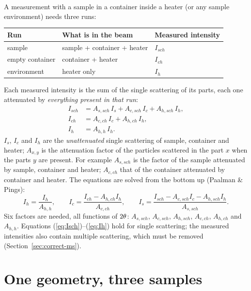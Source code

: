 A measurement with a sample in a container inside a heater (or any sample environment) needs three runs:
\begin{center}\small
\begin{tabular}{@{}lll@{}}
  \toprule \textbf{Run} & \textbf{What is in the beam} & \textbf{Measured intensity} \\ \midrule
  sample & sample + container + heater & $I_{sch}$ \\
  empty container & container + heater & $I_{ch}$ \\
  environment & heater only & $I_{h}$ \\ \bottomrule
\end{tabular}
\end{center}
Each measured intensity is the sum of the single scattering of its parts, each one attenuated by \emph{everything present in that run}:
\begin{align}
  I_{sch} &= A_{s,sch}\, I_s + A_{c,sch}\, I_c + A_{h,sch}\, I_h, \label{eq:Isch}\\
  I_{ch}  &= A_{c,ch}\, I_c + A_{h,ch}\, I_h, \label{eq:Ich}\\
  I_{h}   &= A_{h,h}\, I_h . \label{eq:Ih}
\end{align}
$I_s$, $I_c$ and $I_h$ are the \emph{unattenuated} single scattering of sample, container and heater; $A_{x,y}$ is the attenuation
factor of the particles scattered in the part $x$ when the parts $y$ are present. For example $A_{s,sch}$ is the factor of the
sample attenuated by sample, container and heater; $A_{c,ch}$ that of the container attenuated by container and heater. The equations
are solved from the bottom up (Paalman \& Pings):
\begin{equation}
  I_h = \frac{I_{h}}{A_{h,h}}, \qquad
  I_c = \frac{I_{ch} - A_{h,ch} I_h}{A_{c,ch}}, \qquad
  I_s = \frac{I_{sch} - A_{c,sch} I_c - A_{h,sch} I_h}{A_{s,sch}} .
  \label{eq:pp-chain}
\end{equation}
Six factors are needed, all functions of $2\theta$: $A_{s,sch}$, $A_{c,sch}$, $A_{h,sch}$, $A_{c,ch}$, $A_{h,ch}$ and $A_{h,h}$.
Equations (\ref{eq:Isch})--(\ref{eq:Ih}) hold for single scattering; the measured intensities also contain multiple scattering,
which must be removed (Section~\ref{sec:correct-ms}).

\section{One geometry, three samples}

